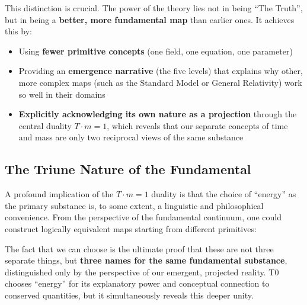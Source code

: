 	This distinction is crucial. The power of the theory lies not in being \enquote{The Truth}, but in being a \textbf{better, more fundamental map} than earlier ones. It achieves this by:
	\begin{itemize}
		\item Using \textbf{fewer primitive concepts} (one field, one equation, one parameter)
		\item Providing an \textbf{emergence narrative} (the five levels) that explains why other, more complex maps (such as the Standard Model or General Relativity) work so well in their domains
		\item \textbf{Explicitly acknowledging its own nature as a projection} through the central duality $T \cdot m = 1$, which reveals that our separate concepts of time and mass are only two reciprocal views of the same substance
	\end{itemize}
	
	\subsection{The Triune Nature of the Fundamental}
	
	A profound implication of the $T \cdot m = 1$ duality is that the choice of \enquote{energy} as the primary substance is, to some extent, a linguistic and philosophical convenience. From the perspective of the fundamental continuum, one could construct logically equivalent maps starting from different primitives:
	
	\begin{center}
	\end{center}
	
	The fact that we can choose is the ultimate proof that these are not three separate things, but \textbf{three names for the same fundamental substance}, distinguished only by the perspective of our emergent, projected reality. T0 chooses \enquote{energy} for its explanatory power and conceptual connection to conserved quantities, but it simultaneously reveals this deeper unity.
	
